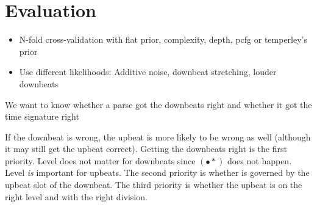 \section{Evaluation}
\label{sec:evaluation}

\begin{itemize}
\item N-fold cross-validation with flat prior, complexity, depth, pcfg or temperley's prior
\item Use different likelihoods: Additive noise, downbeat stretching, louder downbeats
\end{itemize}


We want to know whether a parse got the downbeats right and whether it got the time signature right

If the downbeat is wrong, the upbeat is more likely to be wrong as well (although it may still get the upbeat correct). Getting the downbeats right is the first priority. Level does not matter for downbeats since $(\bullet *)$ does not happen. Level \textit{is} important for upbeats. The second priority is whether is governed by the upbeat slot of the downbeat. The third priority is whether the upbeat is on the right level and with the right division.


